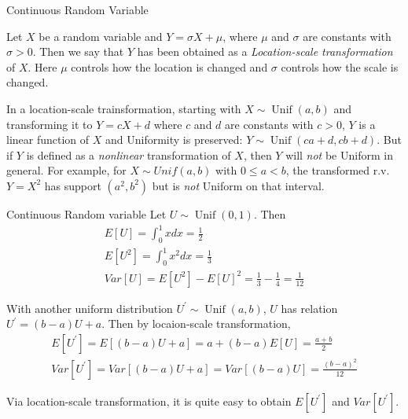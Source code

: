 \documentclass[8pt]{beamer}
\newcommand{\myunif}[2]{\operatorname{Unif}\!\left(#1, #2\right)}
\begin{document}
\begin{frame}{Continuous Random Variable}

    \begin{definition}
        Let $X$ be a random variable and $Y = \sigma X + \mu$, where $\mu$ and $\sigma$ are constants with $\sigma >0$. Then we say that $Y$ has been obtained as a \textit{Location-scale transformation} of $X$. Here $\mu$ controls how the location is changed and $\sigma$ controls how the scale is changed.
    \end{definition}

    \begin{example}
        In a location-scale trainsformation, starting with $X\sim \myunif{a}{b}$ and transforming it to $Y = cX + d$ where $c$ and $d$ are constants with $c >0$, $Y$ is a linear function of $X$ and Uniformity is preserved: $Y \sim \myunif{ca+d}{cb+d}$.  But if $Y$ is defined as a \textit{nonlinear} transformation of $X$, then $Y$ will \textit{not} be Uniform in general. For example, for $X \sim Unif(a,b)$ with $0 \leq a <b$, the transformed r.v. $Y=X^2$ has support $(a^2,b^2)$ but is \textit{not} Uniform on that interval.
    \end{example}

\end{frame}

\begin{frame}{Continuous Random variable}
    Let $U \sim \myunif{0}{1}$. Then 
    \[
    \begin{gathered}
        E[U] = \int_0^1 x dx = \frac{1}{2} \\
        E[U^2] = \int_0^1 x^2 dx = \frac{1}{3} \\
        Var[U] = E[U^2] - E[U]^2 = \frac{1}{3} - \frac{1}{4} = \frac{1}{12} 
    \end{gathered}
    \]
    
    With another uniform distribution $U^\prime \sim \myunif{a}{b}$, $U$ has relation $U^\prime = (b-a)U +a$.
    Then by locaion-scale transformation,
    \[
    \begin{gathered}
        E[U^\prime] = E[(b-a)U+a] = a + (b-a)E[U] = \frac{a+b}{2}\\
        Var[U^\prime] = Var[(b-a)U+a] = Var[(b-a)U] = \frac{(b-a)^2}{12}
    \end{gathered}
    \]

    Via location-scale transformation, it is quite easy to obtain $E[U^\prime]$ and $Var[U^\prime]$.

\end{frame}
\end{document}
